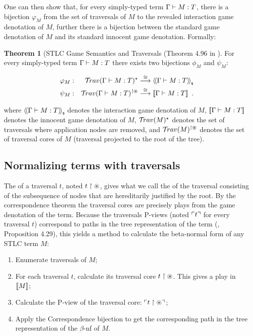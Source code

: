 \documentclass{article}
\theoremstyle{definition}
\newtheorem{theorem}{Theorem}[section]
\begin{document}
One can then show that, for every simply-typed term $\Gamma \vdash M :T$,
there is a bijection $\varphi_M$ from the set of traversals of $M$ to the revealed interaction game denotation of $M$, further there is a bijection between the standard game denotation of $M$ and its standard innocent game denotation. Formally:
\begin{theorem}[STLC Game Semantics and Traversals (Theorem 4.96 in \cite{BlumPhd}]
\label{thm:correspondence}
For every simply-typed term $\Gamma \vdash M :T$ there exists two bijections
$\phi_M$ and $\psi_M$:

\begin{eqnarray*}
 \varphi_M  &:& \mathcal{T}\!rav(\Gamma \vdash M : T)^\star \stackrel{\cong}{\longrightarrow} {\langle\!\langle \Gamma \vdash M :T \rangle\!\rangle}_{\sf s} \\
 \psi_M  &:& \mathcal{T}\!rav(\Gamma \vdash M : T)^{\upharpoonright \circledast} \stackrel{\cong}{\longrightarrow} {[\![ \Gamma \vdash M :T ]\!]} \enspace .
\end{eqnarray*}

where ${\langle\!\langle \Gamma \vdash M : T \rangle\!\rangle}_{\sf s}$ denotes the interaction game denotation of $M$, ${[\![ \Gamma \vdash M : T ]\!]}$ denotes the innocent game denotation of $M$,
$\mathcal{T}\!rav(M)^\star$ denotes the set of traversals where application nodes are removed, and $\mathcal{T}\!rav(M)^{\upharpoonright
\circledast}$ denotes the set of traversal cores of $M$ (\ie traversal projected to the root of the tree).
\end{theorem}

\subsection{Normalizing terms with traversals}

The  of a traversal $t$, noted $t\upharpoonright {\circledast}$, gives what we call the  of the traversal consisting of the subsequence of nodes that are hereditarily justified by the root. By the correspondence theorem the traversal cores are precisely plays from the game denotation of the term.
Because the traversals P-views (noted $\ulcorner t \urcorner$ for every traversal $t$) correspond to paths in the tree representation of the term (\cite{BlumPhd}, Proposition 4.29), this yields a method to calculate the beta-normal form of any STLC term $M$:
\begin{enumerate}
  \item Enumerate traversals of $M$;
  \item For each traversal $t$, calculate its traversal core $t \upharpoonright \circledast$. This gives a play in ${[\![ M ]\!]}$;
  \item Calculate the P-view of the traversal core: $\ulcorner t\upharpoonright \circledast \urcorner$;
  \item Apply the Correspondence bijection to get the corresponding path in the tree representation of the $\beta$-nf of $M$.
\end{enumerate}
\end{document}

